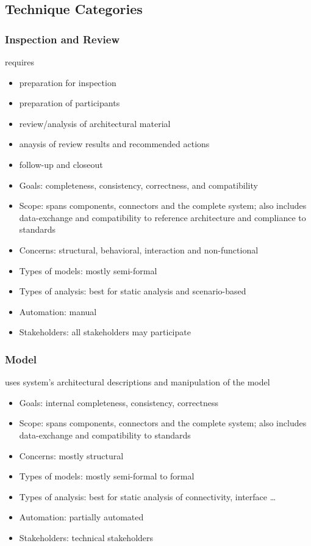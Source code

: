 \documentclass[]{article}
\theoremstyle{definition}
\begin{document}
	\subsection{Technique Categories}
	\subsubsection{Inspection and Review}
	requires
	\begin{itemize}
		\item preparation for inspection
		\item preparation of participants
		\item review/analysis of architectural material
		\item anaysis of review results and recommended actions
		\item follow-up and closeout
	\end{itemize}
	\begin{itemize}
		\item Goals: completeness, consistency, correctness, and compatibility
		\item Scope: spans components, connectors and the complete system; also includes data-exchange and compatibility to reference architecture and compliance to standards
		\item Concerns: structural, behavioral, interaction and non-functional
		\item Types of models: mostly semi-formal
		\item Types of analysis: best for static analysis and scenario-based
		\item Automation: manual
		\item Stakeholders: all stakeholders may participate
	\end{itemize}

	\subsubsection{Model}
	uses system's architectural descriptions and manipulation of the model
	\begin{itemize}
		\item Goals: internal completeness, consistency, correctness
		\item Scope: spans components, connectors and the complete system; also includes data-exchange and compatibility to standards
		\item Concerns: mostly structural
		\item Types of models: mostly semi-formal to formal
		\item Types of analysis: best for static analysis of connectivity, interface \dots
		\item Automation: partially automated
		\item Stakeholders: technical stakeholders
	\end{itemize}
\end{document}
